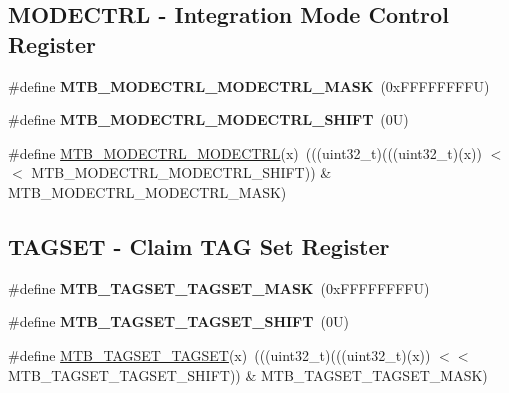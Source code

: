 \subsection*{M\+O\+D\+E\+C\+T\+RL -\/ Integration Mode Control Register}
\begin{DoxyCompactItemize}
\item 
\mbox{\label{group___m_t_b___register___masks_ga1d66deff1d032af57ab9b808a240fa3a}} 
\#define {\bfseries M\+T\+B\+\_\+\+M\+O\+D\+E\+C\+T\+R\+L\+\_\+\+M\+O\+D\+E\+C\+T\+R\+L\+\_\+\+M\+A\+SK}~(0x\+F\+F\+F\+F\+F\+F\+F\+F\+U)
\item 
\mbox{\label{group___m_t_b___register___masks_gaa771d72e2a22b472cb0f5daceeef22bb}} 
\#define {\bfseries M\+T\+B\+\_\+\+M\+O\+D\+E\+C\+T\+R\+L\+\_\+\+M\+O\+D\+E\+C\+T\+R\+L\+\_\+\+S\+H\+I\+FT}~(0\+U)
\item 
\#define \mbox{\hyperlink{group___m_t_b___register___masks_gaff04cf5dbefa8e6e2c809c425d21c150}{M\+T\+B\+\_\+\+M\+O\+D\+E\+C\+T\+R\+L\+\_\+\+M\+O\+D\+E\+C\+T\+RL}}(x)~(((uint32\+\_\+t)(((uint32\+\_\+t)(x)) $<$$<$ M\+T\+B\+\_\+\+M\+O\+D\+E\+C\+T\+R\+L\+\_\+\+M\+O\+D\+E\+C\+T\+R\+L\+\_\+\+S\+H\+I\+FT)) \& M\+T\+B\+\_\+\+M\+O\+D\+E\+C\+T\+R\+L\+\_\+\+M\+O\+D\+E\+C\+T\+R\+L\+\_\+\+M\+A\+SK)
\end{DoxyCompactItemize}
\subsection*{T\+A\+G\+S\+ET -\/ Claim T\+AG Set Register}
\begin{DoxyCompactItemize}
\item 
\mbox{\label{group___m_t_b___register___masks_gae10888ce190a167551d534dac7019f9d}} 
\#define {\bfseries M\+T\+B\+\_\+\+T\+A\+G\+S\+E\+T\+\_\+\+T\+A\+G\+S\+E\+T\+\_\+\+M\+A\+SK}~(0x\+F\+F\+F\+F\+F\+F\+F\+F\+U)
\item 
\mbox{\label{group___m_t_b___register___masks_gac7d7e704f5b16991586fea0dc061bc3d}} 
\#define {\bfseries M\+T\+B\+\_\+\+T\+A\+G\+S\+E\+T\+\_\+\+T\+A\+G\+S\+E\+T\+\_\+\+S\+H\+I\+FT}~(0\+U)
\item 
\#define \mbox{\hyperlink{group___m_t_b___register___masks_ga2988aa0fa7c14b545fe30a05dcc10c67}{M\+T\+B\+\_\+\+T\+A\+G\+S\+E\+T\+\_\+\+T\+A\+G\+S\+ET}}(x)~(((uint32\+\_\+t)(((uint32\+\_\+t)(x)) $<$$<$ M\+T\+B\+\_\+\+T\+A\+G\+S\+E\+T\+\_\+\+T\+A\+G\+S\+E\+T\+\_\+\+S\+H\+I\+FT)) \& M\+T\+B\+\_\+\+T\+A\+G\+S\+E\+T\+\_\+\+T\+A\+G\+S\+E\+T\+\_\+\+M\+A\+SK)
\end{DoxyCompactItemize}
